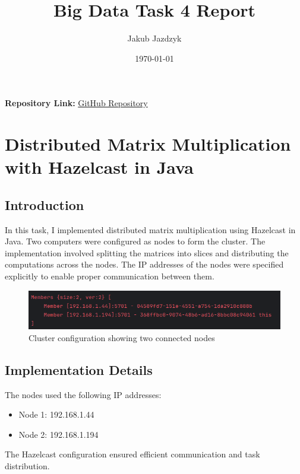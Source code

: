 \documentclass{article}
\title{Big Data Task 4 Report}
\author{Jakub Jazdzyk}
\date{\today}
\begin{document}
\maketitle

\noindent
\textbf{Repository Link:} \href{https://github.com/kubajaz/BIG_DATA_INDIVIDUAL_TASKS_JAKUB_JAZDZYK}{GitHub Repository}

\section{Distributed Matrix Multiplication with Hazelcast in Java}

\subsection{Introduction}
In this task, I implemented distributed matrix multiplication using Hazelcast in Java. Two computers were configured as nodes to form the cluster. The implementation involved splitting the matrices into slices and distributing the computations across the nodes. The IP addresses of the nodes were specified explicitly to enable proper communication between them.

\begin{figure}[H]
    \centering
    \includegraphics[width=\textwidth]{cluster.png}
    \caption{Cluster configuration showing two connected nodes}
\end{figure}

\subsection{Implementation Details}
The nodes used the following IP addresses:
\begin{itemize}
    \item Node 1: 192.168.1.44
    \item Node 2: 192.168.1.194
\end{itemize}
The Hazelcast configuration ensured efficient communication and task distribution.
\end{document}
